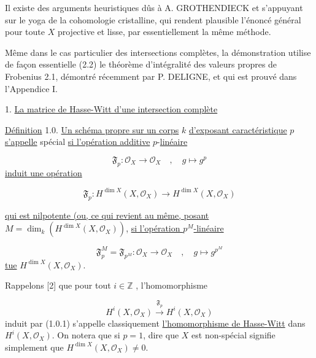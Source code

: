 Il existe des arguments heuristiques dûs à A. GROTHENDIECK et s'appuyant sur le yoga de la cohomologie cristalline, qui rendent plausible l'énoncé général pour toute $X$ projective et lisse, par essentiellement la même méthode.

Même dans le cas particulier des intersections complètes, la démonstration utilise de façon essentielle (2.2) le théorème d'intégralité des valeurs propres de Frobenius 2.1, démontré récemment par P. DELIGNE, et qui est prouvé dans l'Appendice I.


1. \underline{La matrice de Hasse-Witt d'une intersection complète}

\underline{Définition} 1.0. \underline{Un schéma propre sur un corps} $k$ \underline{d'exposant caractéristique} $p$ \underline{s'appelle} spécial \underline{si l'opération additive} $p$-\underline{linéaire}

\begin{equation}\tag{1.0.1}
\mathfrak{F}_p : \mathcal{O}_X \longrightarrow \mathcal{O}_X \quad , \quad g \longmapsto g^p
\end{equation}
\underline{induit une opération}

\begin{equation}\tag{1.0.2}
\mathfrak{F}_p : H^{\dim X}(X,\mathcal{O}_X) \longrightarrow H^{\dim X}(X,\mathcal{O}_X) 
\end{equation}


 \underline{qui est nilpotente (ou, ce qui revient au même, posant} $M = \dim_k(H^{\dim X}(X,\mathcal{O}_X))$, \underline{si l'opération $p^M$-linéaire}

\begin{equation}\tag{1.0.3}
\mathfrak{F}_p^M = \mathfrak{F}_{p^M} : \mathcal{O}_X \longrightarrow \mathcal{O}_X \quad , \quad g \longmapsto g^{p^M}
\end{equation}
\underline{tue} $H^{\dim X}(X,\mathcal{O}_X)$.

Rappelons [2] que pour tout $i \in \mathbb{Z}$ , l'homomorphisme

\begin{equation*}
H^i(X,\mathcal{O}_X) \stackrel{\mathfrak{F}_p}{\longrightarrow} H^i(X,\mathcal{O}_X)
\end{equation*}
induit par (1.0.1) s'appelle classiquement \underline{l'homomorphisme de Hasse-Witt} dans $H^i(X,\mathcal{O}_X)$. On notera que si $p = 1$, dire que $X$ est non-spécial signifie simplement que $H^{\dim X}(X,\mathcal{O}_X) \neq 0$.

